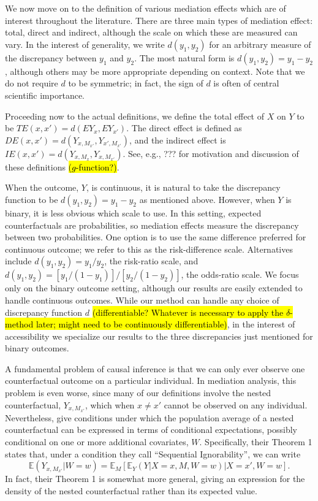 \documentclass{article}
\newcommand{\bE}{\mathbb{E}}
\begin{document}
We now move on to the definition of various mediation effects which are of interest throughout the literature. There are three main types of mediation effect: total, direct and indirect, although the scale on which these are measured can vary. In the interest of generality, we write $d(y_1, y_2)$ for an arbitrary measure of the discrepancy between $y_1$ and $y_2$. The most natural form is $d(y_1, y_2) = y_1 - y_2$, although others may be more appropriate depending on context. Note that we do not require $d$ to be symmetric; in fact, the sign of $d$ is often of central scientific importance.

Proceeding now to the actual definitions, we define the total effect of $X$ on $Y$ to be $TE(x, x') = d(EY_x, EY_{x'})$. The direct effect is defined as $DE(x, x') = d(Y_{x, M_{x'}}, Y_{x', M_{x'}})$, and the indirect effect is $IE(x, x') = d(Y_{x, M_{x}}, Y_{x, M_{x'}})$. See, e.g., ??? for motivation and discussion of these definitions \hl{($g$-function?)}.

When the outcome, $Y$, is continuous, it is natural to take the discrepancy function to be $d(y_1, y_2) = y_1 - y_2$ as mentioned above. However, when $Y$ is binary, it is less obvious which scale to use. In this setting, expected counterfactuals are probabilities, so mediation effects measure the discrepancy between two probabilities. One option is to use the same difference preferred for continuous outcome; we refer to this as the risk-difference scale. Alternatives include $d(y_1, y_2) = y_1 / y_2$, the risk-ratio scale, and $d(y_1, y_2) = [y_1 / (1 - y_1)] / [y_2 / (1 - y_2)]$, the odds-ratio scale. We focus only on the binary outcome setting, although our results are easily extended to handle continuous outcomes. While our method can handle any choice of discrepancy function $d$ \hl{(differentiable? Whatever is necessary to apply the $\delta$-method later; might need to be continuously differentiable)}, in the interest of accessibility we specialize our results to the three discrepancies just mentioned for binary outcomes.

A fundamental problem of causal inference is that we can only ever observe one counterfactual outcome on a particular individual. In mediation analysis, this problem is even worse, since many of our definitions involve the nested counterfactual, $Y_{x, M_{x'}}$, which when $x \neq x'$ cannot be observed on any individual. Nevertheless, \citet{Ima10I} give conditions under which the population average of a nested counterfactual can be expressed in terms of conditional expectations, possibly conditional on one or more additional covariates, $W$. Specifically, their Theorem 1 states that, under a condition they call ``Sequential Ignorability'', we can write
%
\begin{equation}
    \bE (Y_{x, M_{x'}} | W=w) = \bE_M \left[ \bE_Y \left( Y | X=x, M, W=w \right) | X=x', W=w \right]. \label{eq:ID}
\end{equation}
%
In fact, their Theorem 1 is somewhat more general, giving an expression for the density of the nested counterfactual rather than its expected value.
\end{document}
